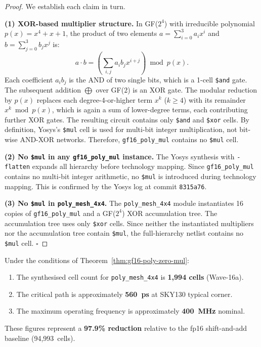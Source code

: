 \begin{proof}
We establish each claim in turn.

\noindent\textbf{(1) XOR-based multiplier structure.}
In GF(\(2^4\)) with irreducible polynomial \(p(x) = x^4 + x + 1\),
the product of two elements
\(a = \sum_{i=0}^{3} a_i x^i\) and \(b = \sum_{j=0}^{3} b_j x^j\)
is:
\[
a \cdot b = \left(\sum_{i,j} a_i b_j x^{i+j}\right) \bmod p(x).
\]
Each coefficient \(a_i b_j\) is the AND of two single bits, which is
a 1-cell \texttt{\$and} gate.
The subsequent addition \(\bigoplus\) over GF(\(2\)) is an XOR gate.
The modular reduction by \(p(x)\) replaces each degree-4-or-higher term
\(x^k\) (\(k \geq 4\)) with its remainder \(x^k \bmod p(x)\), which is
again a sum of lower-degree terms, each contributing further XOR gates.
The resulting circuit contains only \texttt{\$and} and \texttt{\$xor} cells.
By definition, Yosys's \texttt{\$mul} cell is used for multi-bit integer
multiplication, not bit-wise AND-XOR networks.
Therefore, \texttt{gf16\_poly\_mul} contains no \texttt{\$mul} cell.

\noindent\textbf{(2) No \texttt{\$mul} in any \texttt{gf16\_poly\_mul} instance.}
The Yosys synthesis with \texttt{-flatten} expands all hierarchy before
technology mapping.
Since \texttt{gf16\_poly\_mul} contains no multi-bit integer arithmetic,
no \texttt{\$mul} is introduced during technology mapping.
This is confirmed by the Yosys log at commit \texttt{8315a76}.

\noindent\textbf{(3) No \texttt{\$mul} in \texttt{poly\_mesh\_4x4}.}
The \texttt{poly\_mesh\_4x4} module instantiates 16 copies of
\texttt{gf16\_poly\_mul} and a GF(\(2^4\)) XOR accumulation tree.
The accumulation tree uses only \texttt{\$xor} cells.
Since neither the instantiated multipliers nor the accumulation tree
contain \texttt{\$mul}, the full-hierarchy netlist contains no
\texttt{\$mul} cell. \(\square\)
\end{proof}

\begin{corollary}\label{cor:cell-count-timing}
Under the conditions of Theorem~\ref{thm:gf16-poly-zero-mul}:
\begin{enumerate}
  \item The synthesised cell count for \texttt{poly\_mesh\_4x4} is
        \textbf{1,994 cells} (Wave-16a).
  \item The critical path is approximately \textbf{560~ps} at SKY130 typical corner.
  \item The maximum operating frequency is approximately \textbf{400~MHz} nominal.
\end{enumerate}
These figures represent a \textbf{97.9\% reduction} relative to the fp16
shift-and-add baseline (94,993~cells).
\end{corollary}

